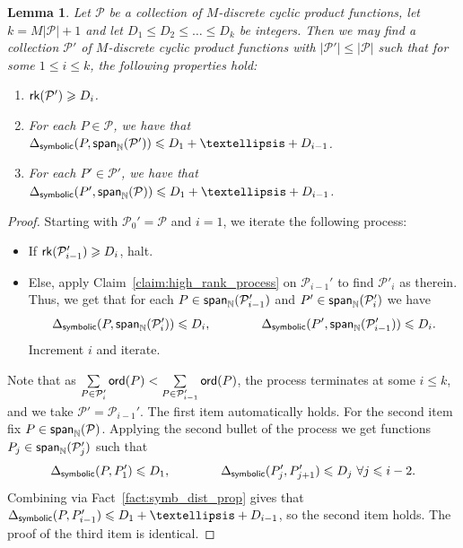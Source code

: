 \documentclass[10pt,a4paper]{amsart}
\newtheorem{lemma}[thm]{Lemma}
\newcommand\card[1]{\left| {#1} \right|}
\newcommand\spn{{\sf span}_{\mathbb{N}}}
\renewcommand\geq{\geqslant}
\renewcommand\leq{\leqslant}
\begin{document}
    \begin{lemma}\label{lem:rank_gain}
        Let $\mathcal{P}$ be a collection of $M$-discrete cyclic product functions, let $k = M \card{\mathcal{P}}+1$ and let $D_1\leq D_2\leq\ldots\leq D_k$ be integers. Then we may find a collection $\mathcal{P}'$ of $M$-discrete cyclic product functions with $|\mathcal{P}'|\leq \card{\mathcal{P}}$ such that for some $1\leq i\leq k$, the  following properties hold:
        \begin{enumerate}
            \item ${\sf rk}(\mathcal{P}')\geq D_i$.
            \item For each $P\in\mathcal{P}$, we have that 
            $\Delta_{{\sf symbolic}}(P,\spn(\mathcal{P}'))\leq D_1+\ldots+D_{i-1}$.
            \item For each $P'\in\mathcal{P}'$, we have that 
            $\Delta_{{\sf symbolic}}(P',\spn(\mathcal{P}))\leq D_1+\ldots+D_{i-1}$.
        \end{enumerate}
    \end{lemma}
    \begin{proof}
        Starting with $\mathcal{P}_0'=\mathcal{P}$ and $i=1$, we iterate the following process:
        \begin{itemize}
            \item If ${\sf rk}(\mathcal{P}'_{i-1})\geq D_i$, halt.
            \item Else, apply Claim~\ref{claim:high_rank_process} on $\mathcal{P}_{i-1}'$ to find $\mathcal{P}'_i$ as therein. Thus, we get that for each $P\in \spn(\mathcal{P}_{i-1}')$ and $P'\in \spn(\mathcal{P}_{i}')$ we have \[
            \Delta_{{\sf symbolic}}(P,\spn(\mathcal{P}_i'))\leq D_i,
            \qquad\qquad
            \Delta_{{\sf symbolic}}(P',\spn(\mathcal{P}_{i-1}'))\leq D_i.
            \]
            Increment $i$ and iterate.
        \end{itemize}
        Note that as $\sum\limits_{P\in\mathcal{P}_i'}{\sf ord}(P)
        <\sum\limits_{P\in\mathcal{P}_{i-1}'}{\sf ord}(P)$, the process terminates at some $i\leq k$, and we take $\mathcal{P}' = \mathcal{P}_{i-1}'$. The first item automatically holds. For the second item fix $P\in\spn(\mathcal{P})$. Applying the second bullet of the process we get functions $P_j\in \spn(\mathcal{P}_{j}')$ such that 
        \[
        \Delta_{\sf symbolic}(P, P_1')\leq D_1,
        \qquad\qquad
        \Delta_{\sf symbolic}(P_{j}', P_{j+1}')\leq D_j~\forall j\leq i-2.
        \]
        Combining via Fact~\ref{fact:symb_dist_prop} gives that $\Delta_{\sf symbolic}(P,P_{i-1}')\leq D_1+\ldots+D_{i-1}$, so the second item holds. The proof of the third item is identical.
    \end{proof}
\end{document}
